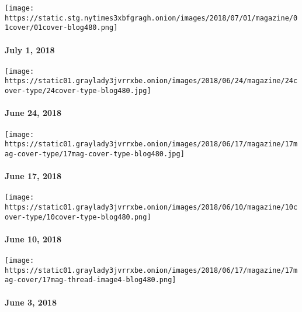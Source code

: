 \href{https://www.nytimes3xbfgragh.onion/issue/magazine/2018/06/28/the-7118-issue}{}

\texttt{[image: https://static.stg.nytimes3xbfgragh.onion/images/2018/07/01/magazine/01cover/01cover-blog480.png]}

\hypertarget{july-1-2018}{%
\paragraph{July 1, 2018}\label{july-1-2018}}

\href{https://www.nytimes3xbfgragh.onion/issue/magazine/2018/06/20/the-62418-issue}{}

\texttt{[image: https://static01.graylady3jvrrxbe.onion/images/2018/06/24/magazine/24cover-type/24cover-type-blog480.jpg]}

\hypertarget{june-24-2018}{%
\paragraph{June 24, 2018}\label{june-24-2018}}

\href{https://www.nytimes3xbfgragh.onion/issue/magazine/2018/06/14/61718-issue}{}

\texttt{[image: https://static01.graylady3jvrrxbe.onion/images/2018/06/17/magazine/17mag-cover-type/17mag-cover-type-blog480.jpg]}

\hypertarget{june-17-2018}{%
\paragraph{June 17, 2018}\label{june-17-2018}}

\href{https://www.nytimes3xbfgragh.onion/interactive/2018/06/07/magazine/new-york-love-city.html}{}

\texttt{[image: https://static01.graylady3jvrrxbe.onion/images/2018/06/10/magazine/10cover-type/10cover-type-blog480.png]}

\hypertarget{june-10-2018}{%
\paragraph{June 10, 2018}\label{june-10-2018}}

\href{https://www.nytimes3xbfgragh.onion/issue/magazine/2018/06/13/6318-issue}{}

\texttt{[image: https://static01.graylady3jvrrxbe.onion/images/2018/06/17/magazine/17mag-cover/17mag-thread-image4-blog480.png]}

\hypertarget{june-3-2018}{%
\paragraph{June 3, 2018}\label{june-3-2018}}

